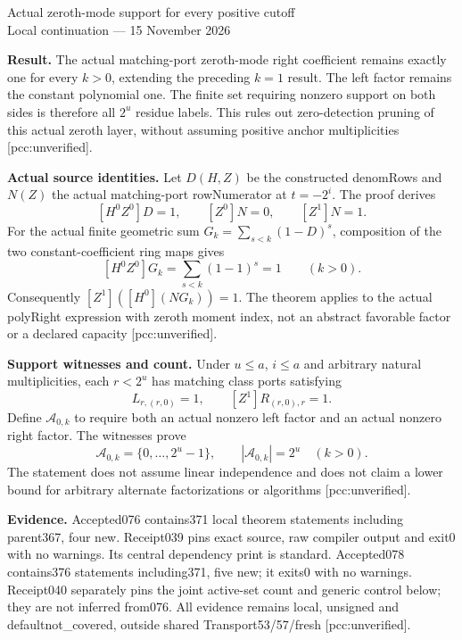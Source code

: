 \documentclass[10pt]{article}
\begin{document}
\begin{center}{\Large Actual zeroth-mode support for every positive cutoff}\\[4pt]
Local continuation --- 15 November 2026\end{center}
\textbf{Result.} The actual matching-port zeroth-mode right coefficient remains
exactly one for every $k>0$, extending the preceding $k=1$ result. The left
factor remains the constant polynomial one. The finite set requiring nonzero
support on both sides is therefore all $2^u$ residue labels. This rules out
zero-detection pruning of this actual zeroth layer, without assuming positive
anchor multiplicities [pcc:unverified].

\textbf{Actual source identities.} Let $D(H,Z)$ be the constructed denomRows
and $N(Z)$ the actual matching-port rowNumerator at $t=-2^i$. The proof derives
\[
 [H^0Z^0]D=1,\qquad [Z^0]N=0,\qquad [Z^1]N=1.
\]
For the actual finite geometric sum $G_k=\sum_{s<k}(1-D)^s$, composition of
the two constant-coefficient ring maps gives
\[
 [H^0Z^0]G_k=\sum_{s<k}(1-1)^s=1 \qquad(k>0).
\]
Consequently $[Z^1]([H^0](NG_k))=1$. The theorem applies to the actual
polyRight expression with zeroth moment index, not an abstract favorable
factor or a declared capacity [pcc:unverified].

\textbf{Support witnesses and count.} Under $u\le a$, $i\le a$ and arbitrary
natural multiplicities, each $r<2^u$ has matching class ports satisfying
\[
 L_{r,(r,0)}=1,\qquad [Z^1]R_{(r,0),r}=1.
\]
Define $\mathcal A_{0,k}$ to require both an actual nonzero left factor and an
actual nonzero right factor. The witnesses prove
\[
 \mathcal A_{0,k}=\{0,\ldots,2^u-1\},\qquad
 |\mathcal A_{0,k}|=2^u \quad(k>0).
\]
The statement does not assume linear independence and does not claim a lower
bound for arbitrary alternate factorizations or algorithms [pcc:unverified].

\textbf{Evidence.} Accepted076 contains371 local theorem statements including
parent367, four new. Receipt039 pins exact source, raw compiler output and
exit0 with no warnings. Its central dependency print is standard. Accepted078 contains376 statements including371, five new; it exits0 with
no warnings. Receipt040 separately pins the joint active-set count and generic
control below; they are not inferred from076. All evidence remains local,
unsigned and defaultnot\_covered, outside shared Transport53/57/fresh
[pcc:unverified].
\end{document}
